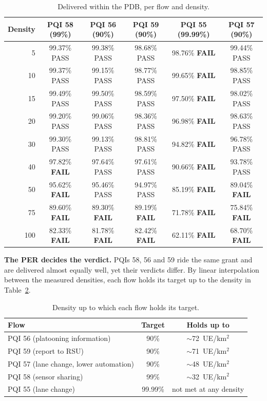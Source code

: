 \documentclass{article}
\newcommand{\pass}{PASS}
\newcommand{\fail}{\textbf{FAIL}}
\begin{document}
\begin{table}[H]
\centering
\caption{Delivered within the PDB, per flow and density.}
\label{tab:rel}
\footnotesize\setlength{\tabcolsep}{3.5pt}
\begin{tabular}{r c c c c c}
\toprule
\textbf{Density} & \textbf{PQI 58 (99\%)} & \textbf{PQI 56 (90\%)} & \textbf{PQI 59 (90\%)} & \textbf{PQI 55 (99.99\%)} & \textbf{PQI 57 (90\%)} \\
\midrule
5   & 99.37\% \pass & 99.38\% \pass & 98.68\% \pass & 98.76\% \fail & 99.44\% \pass \\
10  & 99.37\% \pass & 99.15\% \pass & 98.77\% \pass & 99.65\% \fail & 98.85\% \pass \\
15  & 99.49\% \pass & 99.50\% \pass & 98.59\% \pass & 97.50\% \fail & 98.02\% \pass \\
20  & 99.20\% \pass & 99.06\% \pass & 98.36\% \pass & 96.98\% \fail & 98.63\% \pass \\
30  & 99.30\% \pass & 99.13\% \pass & 98.81\% \pass & 94.82\% \fail & 96.78\% \pass \\
40  & 97.82\% \fail & 97.64\% \pass & 97.61\% \pass & 90.66\% \fail & 93.78\% \pass \\
50  & 95.62\% \fail & 95.46\% \pass & 94.97\% \pass & 85.19\% \fail & 89.04\% \fail \\
75  & 89.60\% \fail & 89.30\% \fail & 89.19\% \fail & 71.78\% \fail & 75.84\% \fail \\
100 & 82.33\% \fail & 81.78\% \fail & 82.42\% \fail & 62.11\% \fail & 68.70\% \fail \\
\bottomrule
\end{tabular}
\end{table}

\textbf{The PER decides the verdict.} PQIs 58, 56 and 59 ride the same
grant and are delivered almost equally well, yet their verdicts differ.
By linear interpolation between the measured densities, each flow holds
its target up to the density in Table~\ref{tab:holds}.

\begin{table}[H]
\centering
\caption{Density up to which each flow holds its target.}
\label{tab:holds}
\small
\begin{tabular}{l c c}
\toprule
\textbf{Flow} & \textbf{Target} & \textbf{Holds up to} \\
\midrule
PQI 56 (platooning information)        & 90\%    & $\sim$72~UE/km$^2$ \\
PQI 59 (report to RSU)                 & 90\%    & $\sim$71~UE/km$^2$ \\
PQI 57 (lane change, lower automation) & 90\%    & $\sim$48~UE/km$^2$ \\
PQI 58 (sensor sharing)                & 99\%    & $\sim$32~UE/km$^2$ \\
PQI 55 (lane change)                   & 99.99\% & not met at any density \\
\bottomrule
\end{tabular}
\end{table}
\end{document}
